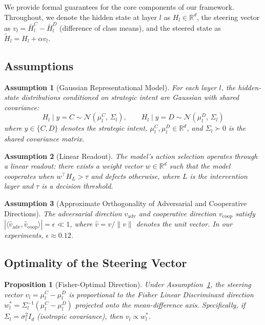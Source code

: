 \documentclass{article}
\newtheorem{assumption}{Assumption}
\newtheorem{proposition}{Proposition}
\begin{document}
We provide formal guarantees for the core components of our framework. Throughout, we denote the hidden state at layer $l$ as $H_l \in \mathbb{R}^d$, the steering vector as $v_l = \bar{H}_l^C - \bar{H}_l^D$ (difference of class means), and the steered state as $\tilde{H}_l = H_l + \alpha v_l$.

\subsection{Assumptions}

\begin{assumption}[Gaussian Representational Model]
\label{asm:gaussian}
For each layer $l$, the hidden-state distributions conditioned on strategic intent are Gaussian with shared covariance:
\[
H_l \mid y = C \sim \mathcal{N}(\mu_l^C,\, \Sigma_l), \qquad H_l \mid y = D \sim \mathcal{N}(\mu_l^D,\, \Sigma_l)
\]
where $y \in \{C, D\}$ denotes the strategic intent, $\mu_l^C, \mu_l^D \in \mathbb{R}^d$, and $\Sigma_l \succ 0$ is the shared covariance matrix.
\end{assumption}

\begin{assumption}[Linear Readout]
\label{asm:readout}
The model's action selection operates through a linear readout: there exists a weight vector $w \in \mathbb{R}^d$ such that the model cooperates when $w^\top H_L > \tau$ and defects otherwise, where $L$ is the intervention layer and $\tau$ is a decision threshold.
\end{assumption}

\begin{assumption}[Approximate Orthogonality of Adversarial and Cooperative Directions]
\label{asm:ortho}
The adversarial direction $v_\text{adv}$ and cooperative direction $v_\text{coop}$ satisfy $|\langle \hat{v}_\text{adv}, \hat{v}_\text{coop} \rangle| = \epsilon \ll 1$, where $\hat{v} = v / \|v\|$ denotes the unit vector. In our experiments, $\epsilon \approx 0.12$.
\end{assumption}

\subsection{Optimality of the Steering Vector}

\begin{proposition}[Fisher-Optimal Direction]
\label{prop:fisher}
Under Assumption~\ref{asm:gaussian}, the steering vector $v_l = \mu_l^C - \mu_l^D$ is proportional to the Fisher Linear Discriminant direction $w_l^* = \Sigma_l^{-1}(\mu_l^C - \mu_l^D)$ projected onto the mean-difference axis. Specifically, if $\Sigma_l = \sigma_l^2 I_d$ (isotropic covariance), then $v_l \propto w_l^*$.
\end{proposition}
\end{document}
